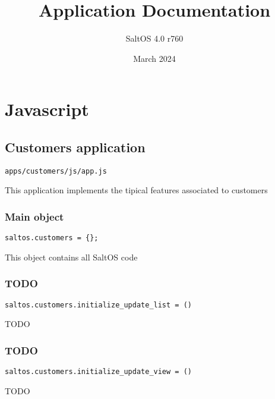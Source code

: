 \documentclass[a4paper]{book}
\title{Application Documentation}
\author{SaltOS 4.0 r760}
\begin{document}
\date{March 2024}
\maketitle
\clearpage

\tableofcontents
\clearpage


\hypertarget{toc1}{}
\chapter{Javascript}

\hypertarget{toc2}{}
\section{Customers application}

\begin{lstlisting}
apps/customers/js/app.js
\end{lstlisting}

This application implements the tipical features associated to customers

\hypertarget{toc3}{}
\subsection{Main object}

\begin{lstlisting}
saltos.customers = {};
\end{lstlisting}

This object contains all SaltOS code

\hypertarget{toc4}{}
\subsection{TODO}

\begin{lstlisting}
saltos.customers.initialize_update_list = ()
\end{lstlisting}

TODO

\hypertarget{toc5}{}
\subsection{TODO}

\begin{lstlisting}
saltos.customers.initialize_update_view = ()
\end{lstlisting}

TODO

\hypertarget{toc6}{}
\end{document}
